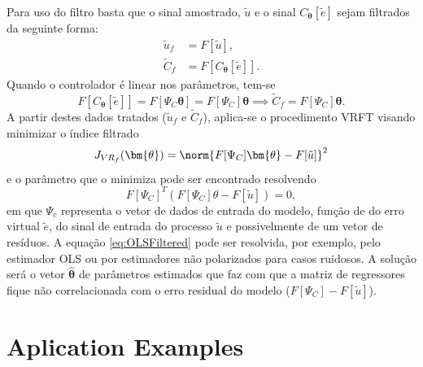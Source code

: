 Para uso do filtro basta que o sinal amostrado, $\tilde{u}$ e o sinal $C_{\bm{\theta}}[\tilde{e}]$ sejam filtrados da seguinte forma:
\begin{align}
   \tilde{u}_f &= F[\tilde{u}], \\
   \tilde{C}_f &= F[C_{\bm{\theta}}[\tilde{e}]].
\label{eq:}
\end{align}
Quando o controlador é linear nos parâmetros, tem-se
\begin{equation}
   F[C_{\bm{\theta}}[\tilde{e}]] = F[\Psi_C \bm{\theta}] = F[\Psi_C]\bm{\theta} \implies \tilde{C}_f = F[\Psi_C] \bm{\theta}.
\end{equation}
A partir destes dados tratados ($\tilde{u}_f$ e $\tilde{C}_f$), aplica-se o procedimento VRFT visando minimizar o índice filtrado
\begin{equation}
   J_{VR_f}(\bm{\theta}) = \norm{F[\Psi_C] \bm{\theta} - F[\tilde{u}]}^2
\label{eq:JVRfiltrado}
\end{equation}
e o parâmetro que o minimiza pode ser encontrado resolvendo 
\begin{equation}
   F[\Psi_C]^{T}\left(F[\Psi_C] \theta-F[\tilde{u}]\right)=0 ,
   \label{eq:OLSFiltered}
\end{equation}
em que $\Psi_c$ representa o vetor de dados de entrada do modelo, função de do erro virtual $\tilde{e}$, do sinal de entrada do processo $\tilde{u}$ e possivelmente de um vetor de resíduos.
A equação \ref{eq:OLSFiltered} pode ser resolvida, por exemplo, pelo estimador OLS ou por estimadores não polarizados para casos ruidosos. A solução será o vetor $\hat{\bm{\theta}}$ de parâmetros estimados que faz com que a matriz de regressores fique não correlacionada com o erro residual do modelo ($F[\Psi_C]-F[\tilde{u}]$).


\section{Aplication Examples}%
\label{sec:aplication_examples}

